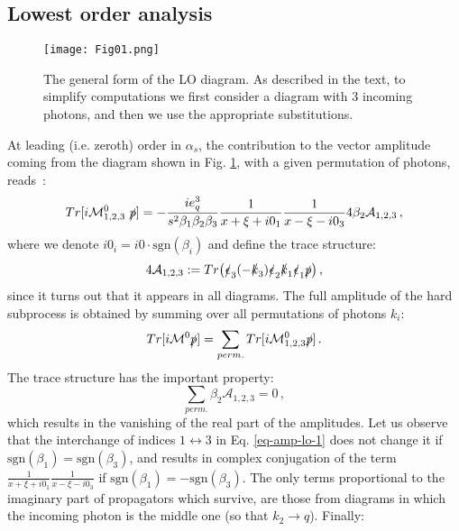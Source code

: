 \documentclass[aps,prd,superscriptaddress,floatfix,showpacs]{revtex4}
\begin{document}
\subsection{Lowest order analysis}
\begin{figure}[h]
    \centering
\texttt{[image: Fig01.png]}
    \caption{The general form of the LO diagram. As described in the text, to simplify computations we first consider a diagram with 3 incoming photons, and then we use the appropriate substitutions.}
    \label{fig:LO}
\end{figure}
At leading (i.e. zeroth) order in $\alpha_s$, the contribution to the vector amplitude coming from the diagram shown in Fig. \ref{fig:LO}, with a given permutation of photons,  reads~\cite{Pedrak:2017cpp}:
\begin{align}
Tr [i\mathcal{M}^0_{1,2,3}~\slashed{p}]
	= -\frac{ie_q^3}{s^{2} \beta_1 \beta_2\beta_3} \frac{1}{x+\xi +i0_1} \frac{1}{x-\xi -i0_3} 4\beta_2 \mathcal{A}_{1,2,3}\,,
	\label{eq-amp-lo-1}
\end{align}
where we denote $i0_i = i0 \cdot \mathrm{sgn}(\beta_i)$ and define the trace structure:
\begin{equation}
4\mathcal{A}_{1,2,3} := 
Tr\big( 
	\slashed{\epsilon}_3 (-\slashed{k}_3) \slashed{\epsilon}_2 \slashed{k}_1 \slashed{\epsilon}_1 \slashed{p} 
	\big)\,,
\end{equation}
 since it turns out that it appears in all diagrams. The full amplitude of the hard subprocess is obtained by summing over all permutations of photons $k_i$:
 \begin{equation}
     Tr[i\mathcal{M}^0 \slashed{p}]= \sum_{perm.}Tr [i\mathcal{M}^0_{1,2,3}\slashed{p}]\,.
 \end{equation}
 The trace structure has the important property:
 \begin{equation}
\sum_{perm.} \beta_2 \mathcal{A}_{1,2,3} =0 \,, 
 \end{equation}
which results in the vanishing of the real part of the amplitudes.  Let us observe that the interchange of indices $1\leftrightarrow 3$ in Eq. \eqref{eq-amp-lo-1} does not change it if $\mathrm{sgn}(\beta_1) = \mathrm{sgn}(\beta_3)$, and results in complex conjugation of the term $\frac{1}{x+\xi + i0_1} \frac{1}{x-\xi -i0_3}$ if $\mathrm{sgn}(\beta_1) = -\mathrm{sgn}(\beta_3)$. The only terms proportional to the imaginary part of propagators which survive, are those from diagrams in which the incoming photon is the middle one (so that $k_2 \rightarrow q$). Finally:
\end{document}
